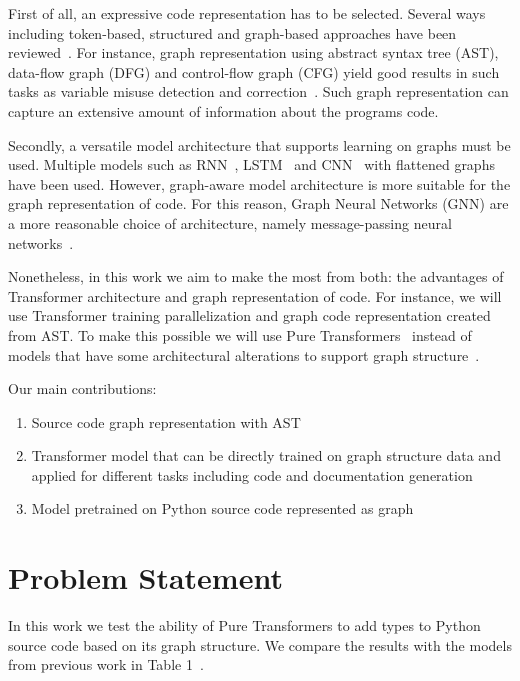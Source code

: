 \documentclass[sigplan,natbib=false]{acmart}
\begin{document}
First of all, an expressive code representation has to be selected.
Several ways including token-based, structured and graph-based approaches have been reviewed~\cite{sm_avdoshin_code_2022}.
For instance, graph representation using abstract syntax tree (AST), data-flow graph (DFG) and control-flow graph (CFG)
yield good results in such tasks as variable misuse detection and correction~\cite{allamanis_learning_2017}.
Such graph representation can capture an extensive amount of information about the programs code.

Secondly, a versatile model architecture that supports learning on graphs must be used.
Multiple models such as RNN~\cite{white_deep_2016}, LSTM~\cite{wei_supervised_2017} and CNN~\cite{mou_convolutional_2016} with flattened graphs have been used.
However, graph-aware model architecture is more suitable for the graph representation of code.
For this reason, Graph Neural Networks (GNN) are a more reasonable choice of architecture,
namely message-passing neural networks~\cite{allamanis_learning_2017}.

Nonetheless, in this work we aim to make the most from both: the advantages of Transformer architecture and graph representation of code.
For instance, we will use Transformer training parallelization and graph code representation created from AST.
To make this possible we will use Pure Transformers~\cite{kim_pure_2022} instead of models that have some architectural alterations to support graph structure~\cite{kreuzer_rethinking_2021,dwivedi_generalization_2021,ying_transformers_2021}.

Our main contributions:
\begin{enumerate}
    \item Source code graph representation with AST
    \item Transformer model that can be directly trained on graph structure data and applied for different tasks including code and documentation generation
    \item Model pretrained on Python source code represented as graph
\end{enumerate}

\section{Problem Statement}\label{sec:problem-statement}

In this work we test the ability of Pure Transformers to add types to Python source code based on its graph structure.
We compare the results with the models from previous work in Table 1~\cite{allamanis2020typilus}.
\end{document}
